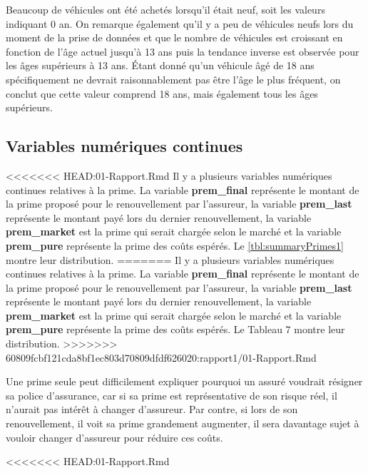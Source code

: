 \documentclass[
]{article}
\begin{document}
Beaucoup de véhicules ont été achetés lorsqu'il était neuf, soit les
valeurs indiquant 0 an. On remarque également qu'il y a peu de véhicules
neufs lors du moment de la prise de données et que le nombre de
véhicules est croissant en fonction de l'âge actuel jusqu'à 13 ans puis
la tendance inverse est observée pour les âges supérieurs à 13 ans.
Étant donné qu'un véhicule âgé de 18 ans spécifiquement ne devrait
raisonnablement pas être l'âge le plus fréquent, on conclut que cette
valeur comprend 18 ans, mais également tous les âges supérieurs.

\hypertarget{variables-numuxe9riques-continues}{%
\subsection{Variables numériques
continues}\label{variables-numuxe9riques-continues}}

\textless\textless\textless\textless\textless\textless\textless{}
HEAD:01-Rapport.Rmd Il y a plusieurs variables numériques continues
relatives à la prime. La variable \textbf{prem\_final} représente le
montant de la prime proposé pour le renouvellement par l'assureur, la
variable \textbf{prem\_last} représente le montant payé lors du dernier
renouvellement, la variable \textbf{prem\_market} est la prime qui
serait chargée selon le marché et la variable \textbf{prem\_pure}
représente la prime des coûts espérés. Le \autoref{tbl:summaryPrimes1}
montre leur distribution. ======= Il y a plusieurs variables numériques
continues relatives à la prime. La variable \textbf{prem\_final}
représente le montant de la prime proposé pour le renouvellement par
l'assureur, la variable \textbf{prem\_last} représente le montant payé
lors du dernier renouvellement, la variable \textbf{prem\_market} est la
prime qui serait chargée selon le marché et la variable
\textbf{prem\_pure} représente la prime des coûts espérés. Le Tableau 7
montre leur distribution.
\textgreater\textgreater\textgreater\textgreater\textgreater\textgreater\textgreater{}
60809fcbf121cda8bf1ec803d70809dfdf626020:rapport1/01-Rapport.Rmd

Une prime seule peut difficilement expliquer pourquoi un assuré voudrait
résigner sa police d'assurance, car si sa prime est représentative de
son risque réel, il n'aurait pas intérêt à changer d'assureur. Par
contre, si lors de son renouvellement, il voit sa prime grandement
augmenter, il sera davantage sujet à vouloir changer d'assureur pour
réduire ces coûts.

\textless\textless\textless\textless\textless\textless\textless{}
HEAD:01-Rapport.Rmd
\end{document}
